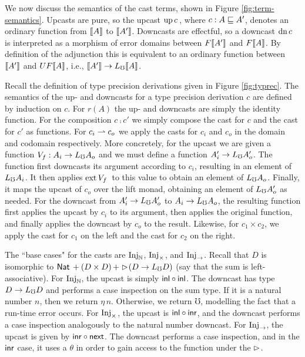 We now discuss the semantics of the cast terms, shown in Figure
\ref{fig:term-semantics}. Upcasts are pure, so the upcast ${\text{up}\,{c}\,}$, where $c :
A \sqsubseteq A'$, denotes an ordinary function from $\llbracket {A} \rrbracket$ to $\llbracket {A'} \rrbracket$.
Downcasts are effectful, so a downcast ${\text{dn}\,{c}\,}$ is interpreted as a morphism
of error domains between $F\llbracket {A'} \rrbracket$ and $F\llbracket {A} \rrbracket$. By definition of the
adjunction this is equivalent to an ordinary function between $\llbracket {A'} \rrbracket$ and
$UF\llbracket {A} \rrbracket$, i.e., $\llbracket {A'} \rrbracket \to L_\mho \llbracket {A} \rrbracket$.

Recall the definition of type precision derivations given in Figure
\ref{fig:typrec}. The semantics of the up- and downcasts for a type precision
derivation $c$ are defined by induction on $c$. For $r(A)$ the up- and downcasts
are simply the identity function. For the composition $c \comp c'$ we simply
compose the cast for $c$ and the cast for $c'$ as functions. For $c_i \rightharpoonup c_o$
we apply the casts for $c_i$ and $c_o$ in the domain and codomain respectively.
More concretely, for the upcast we are given a function $V_f : A_i \to L_\mho A_o$
and we must define a function $A_i' \to L_\mho A_o'$. The function first downcasts
its argument according to $c_i$, resulting in an element of $L_\mho A_i$. It then
applies $\text{ext}\,{V_f}\,{}$ to this value to obtain an element of $L_\mho A_o$. Finally, it
maps the upcast of $c_o$ over the lift monad, obtaining an element of $L_\mho A_o'$
as needed. For the downcast from $A_i' \to L_\mho A_o'$ to $A_i \to L_\mho A_o$, the
resulting function first applies the upcast by $c_i$ to its argument, then
applies the original function, and finally applies the downcast by $c_o$ to the
result. Likewise, for $c_1 \times c_2$, we apply the cast for $c_1$ on the left
and the cast for $c_2$ on the right.

The ``base cases" for the casts are  $\text{Inj}_\mathbb{N}$, $\text{Inj}_\times$, and $\text{Inj}_\to$. Recall
that $D$ is isomorphic to $\mathsf{Nat}\, + (D \times D)\, + \vartriangleright \hspace{-0.2em} (D \to L_\mho D)$
(say that the sum is left-associative).
%
For $\text{Inj}_\mathbb{N}$, the upcast is simply $\mathsf{inl} \circ \mathsf{inl}$. The downcast has type $D
\to L_\mho D$ and performs a case inspection on the sum type. If it is a natural
number $n$, then we return $\eta\, n$. Otherwise, we return $\mho$, modelling
the fact that a run-time error occurs.
%
For $\text{Inj}_\times$, the upcast is $\mathsf{inl} \circ \mathsf{inr}$, and the downcast performs a case
inspection analogously to the natural number downcast.
%
For $\text{Inj}_\to$, the upcast is given by $\mathsf{inr} \circ \mathsf{next}$. The downcast performs a
case inspection, and in the $\mathsf{inr}$ case, it uses a $\theta$ in order to gain
access to the function under the $\vartriangleright$.


